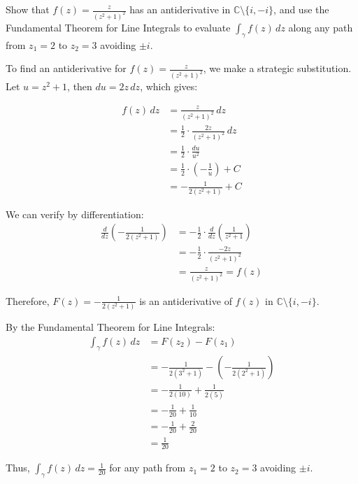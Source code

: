 \exampleline
\begin{example}
Show that $f(z) = \frac{z}{(z^2+1)^2}$ has an antiderivative in $\mathbb{C} \setminus \{i,-i\}$, and use the Fundamental Theorem for Line Integrals to evaluate $\int_{\gamma} f(z)\,dz$ along any path from $z_1 = 2$ to $z_2 = 3$ avoiding $\pm i$.

\begin{solution}
To find an antiderivative for $f(z) = \frac{z}{(z^2+1)^2}$, we make a strategic substitution. Let $u = z^2+1$, then $du = 2z\,dz$, which gives:

\begin{align*}
f(z)\,dz &= \frac{z}{(z^2+1)^2}\,dz \\
&= \frac{1}{2} \cdot \frac{2z}{(z^2+1)^2}\,dz \\
&= \frac{1}{2} \cdot \frac{du}{u^2} \\
&= \frac{1}{2} \cdot (-\frac{1}{u}) + C \\
&= -\frac{1}{2(z^2+1)} + C
\end{align*}

We can verify by differentiation:
\begin{align*}
\frac{d}{dz}\left(-\frac{1}{2(z^2+1)}\right) &= -\frac{1}{2} \cdot \frac{d}{dz}\left(\frac{1}{z^2+1}\right) \\
&= -\frac{1}{2} \cdot \frac{-2z}{(z^2+1)^2} \\
&= \frac{z}{(z^2+1)^2} = f(z)
\end{align*}

Therefore, $F(z) = -\frac{1}{2(z^2+1)}$ is an antiderivative of $f(z)$ in $\mathbb{C} \setminus \{i,-i\}$.

By the Fundamental Theorem for Line Integrals:
\begin{align*}
\int_{\gamma} f(z)\,dz &= F(z_2) - F(z_1) \\
&= -\frac{1}{2(3^2+1)} - \left(-\frac{1}{2(2^2+1)}\right) \\
&= -\frac{1}{2(10)} + \frac{1}{2(5)} \\
&= -\frac{1}{20} + \frac{1}{10} \\
&= -\frac{1}{20} + \frac{2}{20} \\
&= \frac{1}{20}
\end{align*}

Thus, $\int_{\gamma} f(z)\,dz = \frac{1}{20}$ for any path from $z_1 = 2$ to $z_2 = 3$ avoiding $\pm i$.
\end{solution}
\end{example}
\exampleline

\newpage

